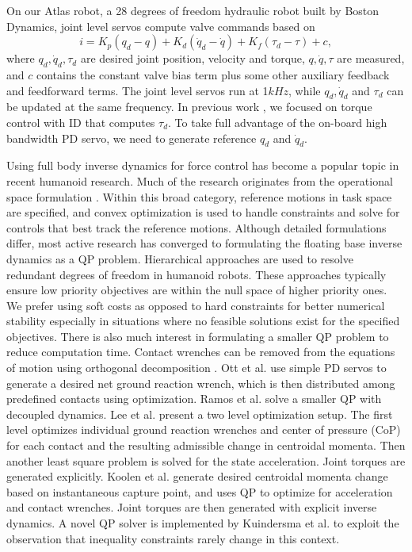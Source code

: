 \documentclass{ws-ijhr}
\begin{document}
On our Atlas robot, a 28 degrees of freedom hydraulic robot built by Boston 
Dynamics, joint level servos compute valve commands based on 
\begin{equation}
  i = K_p(q_d-q) + K_d(\dot{q}_d-\dot{q}) + K_f(\tau_d-\tau) + c,
  \label{eq:servo}
\end{equation}
where $q_d, \dot{q}_d, \tau_d$ are desired joint position, velocity and torque,
$q, \dot{q}, \tau$ are measured, and 
$c$ contains the constant valve bias term plus some other auxiliary feedback
and feedforward terms. 
The joint level servos run at 1$kHz$, while $q_d,\dot{q}_d$ and $\tau_d$ can be
updated at the same frequency.  
In previous work \cite{stephens_thesis,whitman_thesis,sfeng_online}, 
we focused on torque control with ID that computes $\tau_d$. 
To take full advantage of the on-board high bandwidth PD servo, we need to 
generate reference $q_d$ and $\dot{q}_d$. 

Using full body inverse dynamics for force control has become a popular topic
in recent humanoid research. Much of the research originates from the 
operational space formulation \cite{khatib_op_space_ctrl}. 
Within this broad category, reference motions in task space are specified, 
and convex optimization is used to handle constraints and solve for controls
that best track the reference motions. 
Although detailed formulations differ, most active research has converged to 
formulating the floating base inverse dynamics as a QP problem. 
Hierarchical approaches \cite{eth_id,Hutter01052014,alex_hir,saab_fast_hir_qp,deLasa_hir,wensing_hir,sentis_wbc}
are used to resolve redundant degrees of freedom in humanoid robots. 
These approaches typically ensure low priority objectives are within the null
space of higher priority ones. 
We prefer using soft costs as opposed to hard constraints for better numerical 
stability especially in situations where no feasible solutions exist for the 
specified objectives.
There is also much interest in formulating a smaller QP problem to reduce 
computation time. Contact wrenches can be removed from the
equations of motion using orthogonal decomposition \cite{usc_id1}.
Ott et al. \cite{ott_force_alloc} use simple PD servos to generate a 
desired net ground reaction wrench, which is then distributed among predefined 
contacts using optimization.
Ramos et al. \cite{ramos_dyn_walking} solve a smaller QP with decoupled dynamics. 
Lee et al. \cite{lee_separate_grf} present a two level optimization setup. 
The first level optimizes individual ground reaction wrenches and center of pressure
(CoP) for each contact and the resulting admissible change in centroidal momenta. 
Then another least square problem is solved for the state acceleration. 
Joint torques are generated explicitly. 
Koolen et al. \cite{ihmc_vrc} generate desired centroidal momenta change based 
on instantaneous capture point, and uses QP to optimize for acceleration and 
contact wrenches. Joint torques are then generated with explicit inverse dynamics. 
A novel QP solver is implemented by Kuindersma et al. \cite{scott_qp} to exploit
the observation that inequality constraints rarely change in this context.
\end{document}
